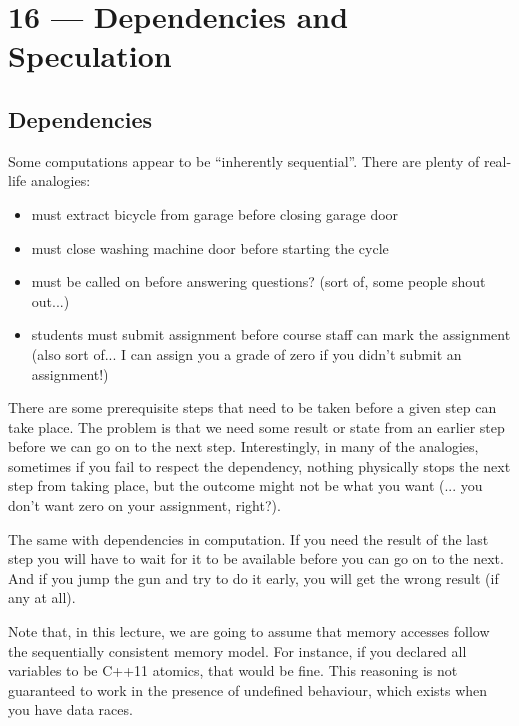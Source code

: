 \documentclass[a4paper]{report}
\begin{document}
\chapter*{16 --- Dependencies and Speculation}


\section*{Dependencies}
Some computations appear to be ``inherently sequential''. There are plenty of real-life analogies:

\begin{itemize}
\item must extract bicycle from garage before closing garage door
 
\item must close washing machine door before starting the cycle
 
\item must be called on before answering questions? (sort of, some people shout out...)
 
\item students must submit assignment before course staff can mark the assignment (also sort of... I can assign you a grade of zero if you didn't submit an assignment!)
\end{itemize}

There are some prerequisite steps that need to be taken before a given step can take place. The problem is that we need some result or state from an earlier step before we can go on to the next step. Interestingly, in many of the analogies, sometimes if you fail to respect the dependency, nothing physically stops the next step from taking place, but the outcome might not be what you want (... you don't want zero on your assignment, right?).

The same with dependencies in computation. If you need the result of the last step you will have to wait for it to be available before you can go on to the next. And if you jump the gun and try to do it early, you will get the wrong result (if any at all).

Note that, in this lecture, we are going to assume that memory accesses follow the
sequentially consistent memory model. For instance, if you declared all variables
to be C++11 atomics, that would be fine. This reasoning is not guaranteed to work
in the presence of undefined behaviour, which exists when you have data races.
\end{document}
